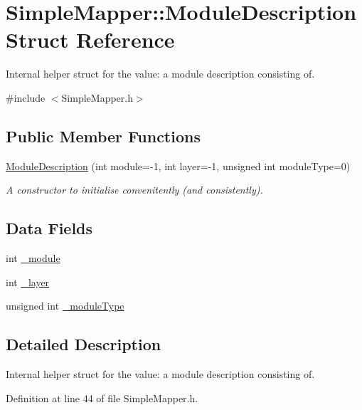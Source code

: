 \hypertarget{struct_simple_mapper_1_1_module_description}{
\section{SimpleMapper::ModuleDescription Struct Reference}
\label{struct_simple_mapper_1_1_module_description}
}


Internal helper struct for the value: a module description consisting of.  


{\ttfamily \#include $<$SimpleMapper.h$>$}\subsection*{Public Member Functions}
\begin{DoxyCompactItemize}
\item 
\hyperlink{struct_simple_mapper_1_1_module_description_a647d050d5ce3bace60cb1f9905b084af}{ModuleDescription} (int module=-\/1, int layer=-\/1, unsigned int moduleType=0)
\begin{DoxyCompactList}\small\item\em A constructor to initialise convenitently (and consistently). \item\end{DoxyCompactList}\end{DoxyCompactItemize}
\subsection*{Data Fields}
\begin{DoxyCompactItemize}
\item 
int \hyperlink{struct_simple_mapper_1_1_module_description_a911114d3bb45d3b400e62889725e2480}{\_\-module}
\item 
int \hyperlink{struct_simple_mapper_1_1_module_description_a6fce11791e489f397fa62f15bf2034d5}{\_\-layer}
\item 
unsigned int \hyperlink{struct_simple_mapper_1_1_module_description_afcf7709bc493381c3fbd78925fe07a46}{\_\-moduleType}
\end{DoxyCompactItemize}


\subsection{Detailed Description}
Internal helper struct for the value: a module description consisting of. 

Definition at line 44 of file SimpleMapper.h.

